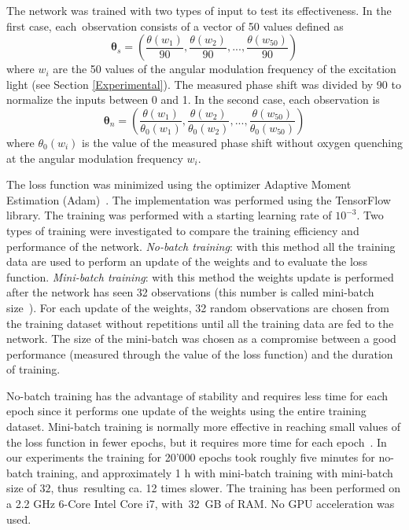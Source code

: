 \documentclass[sensors,article,accept,moreauthors,pdftex,10pt,a4paper]{Definitions/mdpi}
\theoremstyle{definition}
\begin{document}
The network was trained with two types of input to test its effectiveness. In the first case, each~observation consists of a vector of 50 values defined as
\begin{equation}
\label{input1}
{\pmb \theta}_s = \left(
\frac{\theta(w_1)}{90} , \frac{\theta(w_2)}{90} , ..., \frac{\theta(w_{50})}{90} 
\right)
\end{equation}
where $w_i$ are the 50 values of the angular modulation frequency of the excitation light (see Section \ref{Experimental}). The measured phase shift was divided by 90 to normalize the inputs between 0 and 1. In the second case, each observation is
\begin{equation}
\label{input2}
{\pmb \theta}_n = \left(
\frac{\theta(w_1)}{\theta_0(w_1)} , \frac{\theta(w_2)}{\theta_0(w_2)} , ..., \frac{\theta(w_{50})}{\theta_0(w_{50})} 
\right)
\end{equation}
where $\theta_0(w_i)$ is the value of the measured phase shift without oxygen quenching at the angular modulation frequency $w_i$.

The loss function was minimized using the optimizer Adaptive Moment Estimation \mbox{(Adam)~\cite{Kingma2014, Michelucci2017}}. The implementation was performed using the TensorFlow\texttrademark $\ $library. The training was performed with a starting learning rate of $10^{-3}$. Two types of training were investigated to compare the training efficiency and performance of the network. {\sl No-batch training}: with this method all the training data  are used to perform an update of the weights and to evaluate the loss function. {\sl Mini-batch training}: with this method the weights update is performed after the network has seen 32 observations (this number is called mini-batch size~\cite{Michelucci2017}). For each update of the weights, 32 random observations are chosen from the training dataset without repetitions until all the training data are fed to the network. 
The size of the mini-batch was chosen as a compromise between a good performance (measured through the value of the loss function) and the duration of training.

No-batch training has the advantage of stability and requires less time for each epoch since it performs one update of the weights using the entire training dataset. Mini-batch training is normally more effective in reaching small values of the loss function in fewer epochs, but it requires more time for each epoch~\cite{Michelucci2017}. In our experiments the training for 20'000 %
 epochs took roughly five minutes for no-batch training, and approximately 1 h with mini-batch training with mini-batch size of $32$, thus~resulting ca. 12 times slower. The training has been performed on a 2.2 GHz 6-Core Intel Core i7, with~32~GB of RAM. No GPU acceleration was used. 
\end{document}
